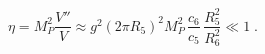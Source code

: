 \begin{equation}
\eta = M_P^2 \frac{V''}{V} \approx g^2 (2\pi R_5)^2 M_P^2 \,
\frac{c_6}{c_5} \, \frac{R_5^2}{R_6^2} \ll 1 \;.
\end{equation}

